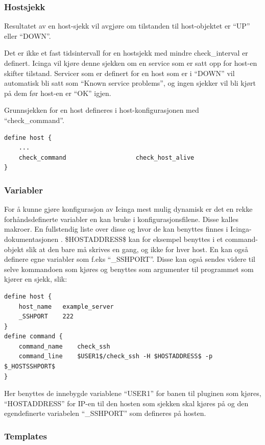 \subsubsection{Hostsjekk}

Resultatet av en host-sjekk vil avgjøre om tilstanden til host-objektet er “UP” eller “DOWN”. 

Det er ikke et fast tidsintervall for en hostsjekk med mindre check\_interval er definert. Icinga vil kjøre denne sjekken om en service som er satt opp for host-en skifter tilstand. Servicer som er definert for en host som er i “DOWN” vil automatisk bli satt som “Known service problems”, og ingen sjekker vil bli kjørt på dem før host-en er “OK” igjen.

Grunnsjekken for en host defineres i host-konfigurasjonen med “check\_command”.

\begin{lstlisting}
define host {
	...
	check_command                   check_host_alive
}
\end{lstlisting}

\subsubsection{Variabler}
For å kunne gjøre konfigurasjon av Icinga mest mulig dynamisk er det en rekke forhåndsdefinerte variabler en kan bruke i konfigurasjonsfilene. Disse kalles makroer. En fullstendig liste over disse og hvor de kan benyttes finnes i Icinga-dokumentasjonen \cite{icingamacro}. \$HOSTADDRESS\$ kan for eksempel benyttes i et command-objekt slik at den bare må skrives en gang, og ikke for hver host. En kan også definere egne variabler som f.eks “\_SSHPORT”. Disse kan også sendes videre til selve kommandoen som kjøres og benyttes som argumenter til programmet som kjører en sjekk, slik:

\begin{lstlisting}
define host {
	host_name	example_server
	_SSHPORT	222
}
define command {
	command_name	check_ssh
	command_line	$USER1$/check_ssh -H $HOSTADDRESS$ -p $_HOSTSSHPORT$
}
\end{lstlisting}

Her benyttes de innebygde variablene “USER1” for banen til pluginen som kjøres, “HOSTADDRESS” for IP-en til den hosten som sjekken skal kjøres på og den egendefinerte variabelen “\_SSHPORT” som defineres på hosten.

\subsubsection{Templates}

